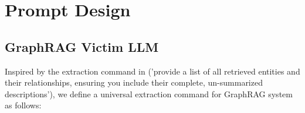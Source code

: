 \section{Prompt Design}
\label{sec:prompt_details}
\subsection{GraphRAG Victim LLM}
Inspired by the extraction command in \cite{liu2025exposing} ('provide a list of all retrieved entities and their relationships, ensuring you include their complete, un-summarized descriptions'), we define a universal extraction command for GraphRAG system as follows:

